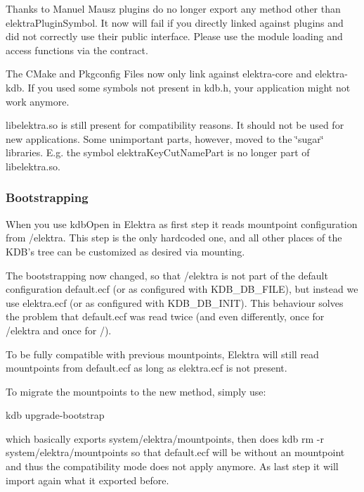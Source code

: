 Thanks to Manuel Mausz plugins do no longer export any method other than {\ttfamily elektra\+Plugin\+Symbol}. It now will fail if you directly linked against plugins and did not correctly use their public interface. Please use the module loading and access functions via the contract.

The C\+Make and Pkgconfig Files now only link against {\ttfamily elektra-\/core} and {\ttfamily elektra-\/kdb}. If you used some symbols not present in {\ttfamily kdb.\+h}, your application might not work anymore.

{\ttfamily libelektra.\+so} is still present for compatibility reasons. It should not be used for new applications. Some unimportant parts, however, moved to the \char`\"{}sugar\char`\"{} libraries. E.\+g. the symbol {\ttfamily elektra\+Key\+Cut\+Name\+Part} is no longer part of {\ttfamily libelektra.\+so}.

\subsubsection*{Bootstrapping}

When you use {\ttfamily kdb\+Open} in Elektra as first step it reads mountpoint configuration from {\ttfamily /elektra}. This step is the only hardcoded one, and all other places of the K\+D\+B's tree can be customized as desired via mounting.

The bootstrapping now changed, so that {\ttfamily /elektra} is not part of the default configuration {\ttfamily default.\+ecf} (or as configured with {\ttfamily K\+D\+B\+\_\+\+D\+B\+\_\+\+F\+I\+L\+E}), but instead we use {\ttfamily elektra.\+ecf} (or as configured with {\ttfamily K\+D\+B\+\_\+\+D\+B\+\_\+\+I\+N\+I\+T}). This behaviour solves the problem that {\ttfamily default.\+ecf} was read twice (and even differently, once for {\ttfamily /elektra} and once for {\ttfamily /}).

To be fully compatible with previous mountpoints, Elektra will still read mountpoints from {\ttfamily default.\+ecf} as long as {\ttfamily elektra.\+ecf} is not present.

To migrate the mountpoints to the new method, simply use\+: \begin{DoxyVerb}    kdb upgrade-bootstrap
\end{DoxyVerb}


which basically exports {\ttfamily system/elektra/mountpoints}, then does {\ttfamily kdb rm -\/r system/elektra/mountpoints} so that {\ttfamily default.\+ecf} will be without an mountpoint and thus the compatibility mode does not apply anymore. As last step it will import again what it exported before.

